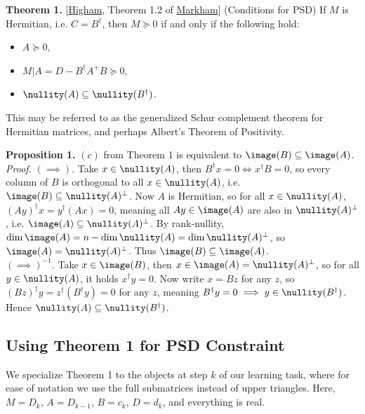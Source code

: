 \documentclass[12pt]{article}
\begin{document}
    \textbf{Theorem 1.} [\href{https://nhigham.com/2023/06/01/what-is-the-schur-complement-of-a-matrix/?utm_source=chatgpt.com}{Higham}, Theorem 1.2 of \href{https://scholarcommons.sc.edu/cgi/viewcontent.cgi?article=1032&context=math_facpub}{Markham}] (Conditions for PSD) If $M$ is Hermitian, i.e. $C = B^\dagger$, then $M \succeq 0$ if and only if the following hold:
    \begin{itemize}
        \item[(a)] $A \succeq 0$,
        \item[(b)] $M|A = D - B^\dagger A^+ B \succeq 0$,
        \item[(c)] $\nullity(A) \subseteq \nullity(B^\dagger)$.
    \end{itemize}
    This may be referred to as the generalized Schur complement theorem for Hermitian matrices, and perhaps Albert's Theorem of Positivity.

    \textbf{Proposition 1.} $(c)$ from Theorem 1 is equivalent to $\image(B) \subseteq \image (A)$. \\[-6pt]
    
    \textit{Proof.} $(\implies)$. Take $x \in \nullity(A)$, then $B^\dagger x = 0 \iff x^\dagger B = 0$, so every column of $B$ is orthogonal to all $x \in \nullity(A)$, i.e. $\image(B) \subseteq \nullity(A)^\perp$. Now $A$ is Hermitian, so for all $x \in \nullity(A)$, $(Ay)^\dagger x = y^\dagger (A x) = 0$, meaning all $Ay \in \image(A)$ are also in $\nullity(A)^\perp$, i.e. $\image(A) \subseteq \nullity(A)^\perp$. By rank-nullity, $\dim \image(A) = n - \dim \nullity(A) = \dim \nullity(A)^\perp$, so $\image(A) = \nullity(A)^\perp$. Thus $\image(B) \subseteq \image(A)$. \\[-6pt]

    $(\implies)^{-1}$. Take $x \in \image(B)$, then $x \in \image(A) = \nullity(A)^\perp$, so for all $y \in \nullity(A)$, it holds $x^\dagger y = 0$. Now write $x = Bz$ for any $z$, so $(Bz)^\dagger y = z^\dagger(B^\dagger y) = 0$ for any $z$, meaning $B^\dagger y = 0 \implies y \in \nullity(B^\dagger)$. Hence $\nullity(A) \subseteq \nullity(B^\dagger)$.

    \subsection{Using Theorem 1 for PSD Constraint}
    We specialize Theorem 1 to the objects at step $k$ of our learning task, where for ease of notation we use the full submatrices instead of upper triangles. Here, $M = D_k$, $A = D_{k-1}$, $B = c_k$, $D = d_k$, and everything is real. \\[-6pt]
\end{document}
